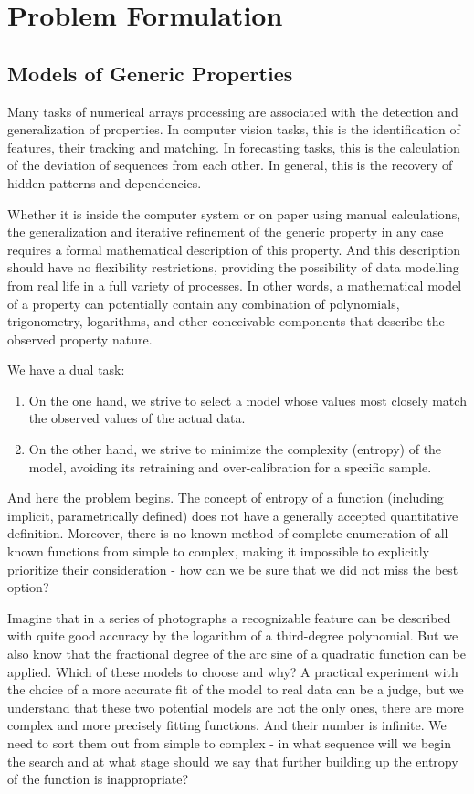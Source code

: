 \documentclass[a4paper, 11pt, oneside]{book}
\begin{document}
\section{Problem Formulation}
\subsection{Models of Generic Properties}
Many tasks of numerical arrays processing are associated with the detection and generalization of properties. In computer vision tasks, this is the identification of features, their tracking and matching. In forecasting tasks, this is the calculation of the deviation of sequences from each other. In general, this is the recovery of hidden patterns and dependencies.

Whether it is inside the computer system or on paper using manual calculations, the generalization and iterative refinement of the generic property in any case requires a formal mathematical description of this property. And this description should have no flexibility restrictions, providing the possibility of data modelling from real life in a full variety of processes. In other words, a mathematical model of a property can potentially contain any combination of polynomials, trigonometry, logarithms, and other conceivable components that describe the observed property nature.

We have a dual task:
\begin{enumerate}
	\item On the one hand, we strive to select a model whose values most closely match the observed values of the actual data.
  \item On the other hand, we strive to minimize the complexity (entropy) of the model, avoiding its retraining and over-calibration for a specific sample.
\end{enumerate}

And here the problem begins. The concept of entropy of a function (including implicit, parametrically defined) does not have a generally accepted quantitative definition. Moreover, there is no known method of complete enumeration of all known functions from simple to complex, making it impossible to explicitly prioritize their consideration - how can we be sure that we did not miss the best option?

Imagine that in a series of photographs a recognizable feature can be described with quite good accuracy by the logarithm of a third-degree polynomial. But we also know that the fractional degree of the arc sine of a quadratic function can be applied. Which of these models to choose and why? A practical experiment with the choice of a more accurate fit of the model to real data can be a judge, but we understand that these two potential models are not the only ones, there are more complex and more precisely fitting functions. And their number is infinite. We need to sort them out from simple to complex - in what sequence will we begin the search and at what stage should we say that further building up the entropy of the function is inappropriate?
\end{document}
